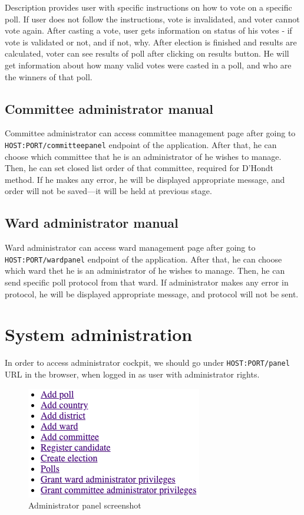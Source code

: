 \documentclass[a4paper,twoside,12pt]{book}
\begin{document}
      Description provides user with specific instructions on how to vote on a specific poll. If user does not follow the instructions, vote is invalidated, and voter cannot vote again.
      After casting a vote, user gets information on status of his votes - if vote is validated or not, and if not, why.
      After election is finished and results are calculated, voter can see results of poll after clicking on results button.
      He will get information about how many valid votes were casted in a poll, and who are the winners of that poll.

    \subsection{Committee administrator manual}
      Committee administrator can access committee management page after going to \lstinline|HOST:PORT/committeepanel| endpoint of the application.
      After that, he can choose which committee that he is an administrator of he wishes to manage.
      Then, he can set closed list order of that committee, required for D'Hondt method.
      If he makes any error, he will be displayed appropriate message, and order will not be saved---it will be held at previous stage.

    \subsection{Ward administrator manual}
      Ward administrator can access ward management page after going to \lstinline|HOST:PORT/wardpanel| endpoint of the application.
      After that, he can choose which ward thet he is an administrator of he wishes to manage.
      Then, he can send specific poll protocol from that ward.
      If administrator makes any error in protocol, he will be displayed appropriate message, and protocol will not be sent.

  \section{System administration}
    In order to access administrator cockpit, we should go under \lstinline|HOST:PORT/panel| URL in the browser, when logged in as user with administrator rights.
    \begin{figure}[h]
      \centering
      \includegraphics[width=0.5\linewidth]{admin_panel_screenshot.png}
      \caption{Administrator panel screenshot}
      \label{fig:admin_panel_screenshot}
    \end{figure}
\end{document}
